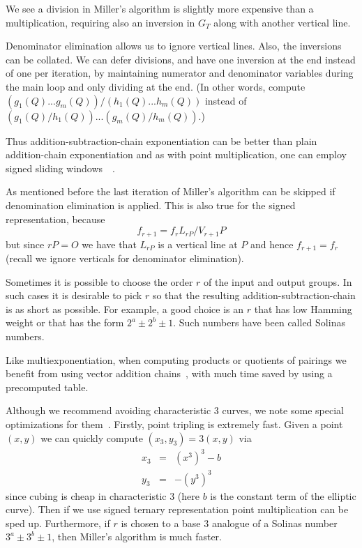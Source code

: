 We see a division in Miller's algorithm is slightly more expensive than
a multiplication, requiring also an inversion in $G_T$ along with
another vertical line.

Denominator elimination allows us to ignore vertical lines.
Also, the inversions can be collated. We can defer divisions,
and have one inversion at the end instead of one per iteration,
by maintaining numerator and denominator variables during the main loop
and only dividing at the end.
(In other words, compute $(g_1(Q) ... g_m(Q)) / (h_1(Q) ... h_m(Q))$
instead of $(g_1(Q) / h_1(Q)) ... (g_m(Q) / h_m(Q))$.)

Thus addition-subtraction-chain exponentiation can be
better than plain addition-chain exponentiation and as with
point multiplication, one can employ signed sliding
windows~\cite[Chapter 14]{handbook}~\cite[Section IV.2.5]{bss}.

As mentioned before the last iteration of Miller's algorithm can be skipped
if denomination elimination is applied.
This is also true for the signed representation, because
\[
f_{r+1} = f_r L_{rP} / V_{r+1}P
\]
but since $rP = O$
we have that $L_{rP}$ is a vertical line at $P$ and hence $f_{r+1} = f_r$
(recall we ignore verticals for denominator elimination).

Sometimes it is possible to choose the order $r$ of the input and output
groups. In such cases it is desirable to pick $r$ so that the resulting
addition-subtraction-chain is as short as possible. For example,
a good choice is an $r$ that has low Hamming weight or that has the form
$2^a \pm 2^b \pm 1$. Such numbers have been called Solinas numbers.

Like multiexponentiation,
when computing products or quotients of pairings we
benefit from using vector addition chains~\cite[Chapter 14]{handbook},
with much time saved by using a precomputed table.

Although we recommend avoiding characteristic 3 curves,
we note some special optimizations for them~\cite{bakls}.
Firstly, point tripling is extremely fast.
Given a point $(x,y)$ we can quickly
compute $(x_3,y_3) = 3(x,y)$ via
\[
\begin{array}{lcl}
x_3 &=& (x^3)^3 - b \\
y_3 &=& -(y^3)^3
\end{array}
\]
since cubing is cheap in characteristic 3
(here $b$ is the constant term of the elliptic curve).
Then if we use signed ternary representation point multiplication can be
sped up. Furthermore, if $r$ is chosen to
a base 3 analogue of a Solinas number $3^a \pm 3^b \pm 1$,
then Miller's algorithm is much faster.

